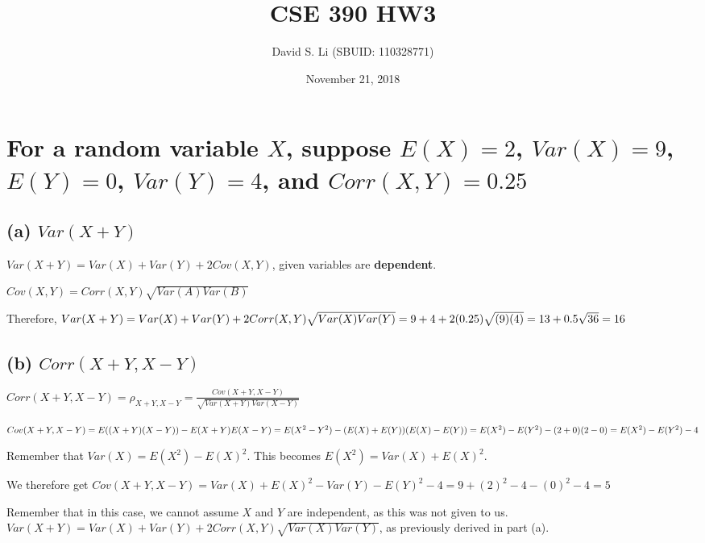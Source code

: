 \documentclass{article}
\title{CSE 390 HW3}
\author{David S. Li (SBUID: 110328771)}
\date{November 21, 2018}
\begin{document}
\maketitle

\section{For a random variable $X$, suppose $E(X) = 2$, $Var(X) = 9$, $E(Y) = 0$, $Var(Y) = 4$, and $Corr(X, Y) = 0.25$}
\subsection{(a) $Var(X + Y)$}
\par\noindent\Large $Var(X + Y) = Var(X) + Var(Y) + 2Cov(X, Y)$, given variables are \textbf{dependent}.
\par\noindent\Large $Cov(X, Y) = Corr(X, Y)\sqrt{Var(A)Var(B)}$\vspace{0.25cm}

\par\noindent\Large Therefore, $Var(X + Y) = Var(X) + Var(Y) + 2Corr(X, Y)\sqrt{Var(X)Var(Y)} =\linebreak 9 + 4 + 2(0.25)\sqrt{(9)(4)} = 13 + 0.5\sqrt{36} = 16$

\subsection{(b) $Corr(X + Y, X - Y)$}
\par\noindent\Large $Corr(X + Y, X - Y) = \rho_{X + Y, X - Y} = \frac{Cov(X + Y, X - Y)}{\sqrt{Var(X + Y)Var(X - Y)}}$\vspace{0.25cm}

\par\noindent\Large $Cov(X + Y, X - Y) = E((X + Y)(X - Y)) - E(X + Y)E(X - Y) =\linebreak E(X^{2} - Y^{2}) - (E(X) + E(Y))(E(X) - E(Y)) = E(X^{2}) - E(Y^{2}) - (2 + 0)(2 - 0) = E(X^{2}) - E(Y^{2}) - 4$
\par\noindent\Large Remember that $Var(X) = E(X^{2}) - E(X)^{2}$.  This becomes $E(X^{2}) = Var(X) + E(X)^{2}$.
\par\noindent\Large We therefore get $Cov(X + Y, X - Y) = Var(X) + E(X)^{2} - Var(Y) - E(Y)^{2} - 4 = 9 + (2)^{2} - 4 - (0)^{2} - 4 = 5$\vspace{0.25cm}

\par\noindent\Large Remember that in this case, we cannot assume $X$ and $Y$ are independent, as this was not given to us.  $Var(X + Y) = Var(X) + Var(Y) + 2Corr(X, Y)\sqrt{Var(X)Var(Y)}$, as previously derived in part (a).\vspace{0.25cm}
\end{document}
